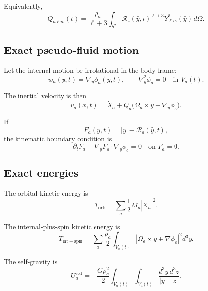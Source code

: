 \documentclass[journal, a4paper]{IEEEtran}
\begin{document}
Equivalently,
\begin{equation}
Q_{a\ell m}(t)
=
\frac{\rho_a}{\ell+3}
\int_{S^2}
\mathcal{R}_a(\hat y,t)^{\ell+3}
Y_{\ell m}^{*}(\hat y)\,d\Omega.
\label{eq:QlmSurface}
\end{equation}

\subsection{Exact pseudo-fluid motion}

Let the internal motion be irrotational in the body frame:
\begin{equation}
w_a(y,t)=\nabla_y \phi_a(y,t),
\qquad
\nabla_y^2 \phi_a = 0
\quad \text{in }V_a(t).
\label{eq:phi}
\end{equation}

The inertial velocity is then
\begin{equation}
v_a(x,t)
=
\dot X_a + Q_a \bigl(\Omega_a \times y + \nabla_y \phi_a \bigr).
\label{eq:v-inertial}
\end{equation}

If
\begin{equation}
F_a(y,t)=|y|-\mathcal{R}_a(\hat y,t),
\end{equation}
the kinematic boundary condition is
\begin{equation}
\partial_t F_a + \nabla_y F_a\cdot \nabla_y \phi_a = 0
\quad \text{on }F_a=0.
\label{eq:kinematic}
\end{equation}

\subsection{Exact energies}

The orbital kinetic energy is
\begin{equation}
T_{\mathrm{orb}}
=
\sum_a \frac{1}{2} M_a |\dot X_a|^2.
\label{eq:Torb}
\end{equation}

The internal-plus-spin kinetic energy is
\begin{equation}
T_{\mathrm{int+spin}}
=
\sum_a
\frac{\rho_a}{2}
\int_{V_a(t)}
\left|
\Omega_a\times y + \nabla\phi_a
\right|^2 d^3y.
\label{eq:Tspinfull}
\end{equation}

The self-gravity is
\begin{equation}
U_a^{\mathrm{self}}
=
-\frac{G\rho_a^2}{2}
\int_{V_a(t)}\int_{V_a(t)}
\frac{d^3y\,d^3z}{|y-z|}.
\label{eq:Uself}
\end{equation}
\end{document}
